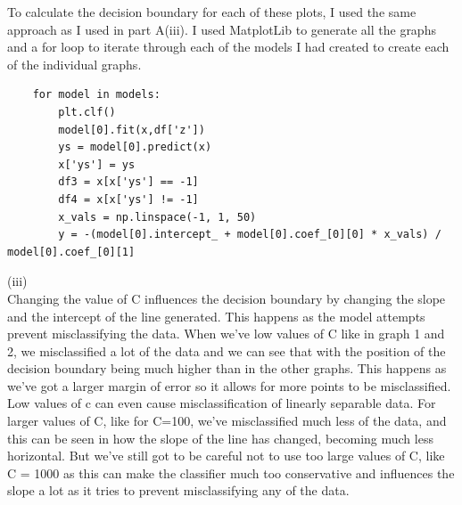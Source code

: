\documentclass[10pt,a4paper]{article}
\begin{document}
To calculate the decision boundary for each of these plots, I used the same approach as I used in part A(iii). I used MatplotLib to generate all the graphs and a for loop to iterate through each of the models I had created to create each of the individual graphs.
\begin{verbatim}
    for model in models:
        plt.clf()
        model[0].fit(x,df['z'])
        ys = model[0].predict(x)
        x['ys'] = ys
        df3 = x[x['ys'] == -1]
        df4 = x[x['ys'] != -1]
        x_vals = np.linspace(-1, 1, 50)
        y = -(model[0].intercept_ + model[0].coef_[0][0] * x_vals) / model[0].coef_[0][1]
\end{verbatim}
(iii)
\\
Changing the value of C influences the decision boundary by changing the slope and the intercept of the line generated. This happens as the model attempts prevent misclassifying the data. When we've low values of C like in graph 1 and 2, we misclassified a lot of the data and we can see that with the position of the decision boundary being much higher than in the other graphs. This happens as we've got a larger margin of error so it allows for more points to be misclassified. Low values of c can even cause misclassification of linearly separable data. For larger values of C, like for C=100, we've misclassified much less of the data, and this can be seen in how the slope of the line has changed, becoming much less horizontal. But we've still got to be careful not to use too large values of C, like C = 1000 as this can make the classifier much too conservative and influences the slope a lot as it tries to prevent misclassifying any of the data.
\end{document}

